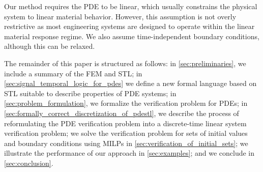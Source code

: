 \documentclass[letterpaper, 10 pt, conference]{ieeeconf/ieeeconf}
\begin{document}



Our method requires the PDE to be linear, which usually constrains the
physical system to linear material behavior. However, this assumption is
not overly restrictive as most engineering systems are designed to operate
within the linear material response regime. We also assume 
time-independent boundary conditions, although this can be relaxed.

The remainder of this paper is structured as follows: in
\cref{sec:preliminaries}, we include a summary of the FEM and STL; 
in \cref{sec:signal_temporal_logic_for_pdes} we
define a new formal language based on STL suitable to describe properties of PDE
systems; in \cref{sec:problem_formulation}, we formalize the verification problem
for PDEs; in \cref{sec:formally_correct_discretization_of_pdestl}, we describe
the process of reformulating the PDE verification problem into a discrete-time
linear system verification problem; we solve the verification problem for sets
of initial values and boundary conditions using MILPs in
\cref{sec:verification_of_initial_sets}; we illustrate the performance of our
approach in \cref{sec:examples}; and we conclude in \cref{sec:conclusion}.
\end{document}
